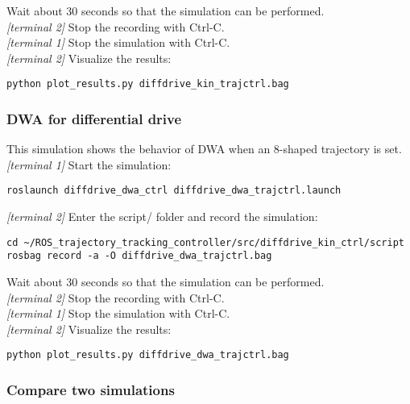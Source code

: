 \documentclass[11pt,a4paper]{article}
\begin{document}
Wait about 30 seconds so that the simulation can be performed.\\

\textit{[terminal 2]} Stop the recording with Ctrl-C.\\

\textit{[terminal 1]} Stop the simulation with Ctrl-C.\\

\textit{[terminal 2]} Visualize the results:
\begin{lstlisting}
python plot_results.py diffdrive_kin_trajctrl.bag
\end{lstlisting}

\subsubsection{DWA for differential drive}

This simulation shows the behavior of DWA when an 8-shaped trajectory is set.\\

\textit{[terminal 1]} Start the simulation:
\begin{lstlisting}
roslaunch diffdrive_dwa_ctrl diffdrive_dwa_trajctrl.launch
\end{lstlisting}

\textit{[terminal 2]} Enter the script/ folder and record the simulation:
\begin{lstlisting}
cd ~/ROS_trajectory_tracking_controller/src/diffdrive_kin_ctrl/script
rosbag record -a -O diffdrive_dwa_trajctrl.bag
\end{lstlisting}

Wait about 30 seconds so that the simulation can be performed.\\

\textit{[terminal 2]} Stop the recording with Ctrl-C.\\

\textit{[terminal 1]} Stop the simulation with Ctrl-C.\\

\textit{[terminal 2]} Visualize the results:
\begin{lstlisting}
python plot_results.py diffdrive_dwa_trajctrl.bag
\end{lstlisting}


\subsubsection{Compare two simulations}
\end{document}
